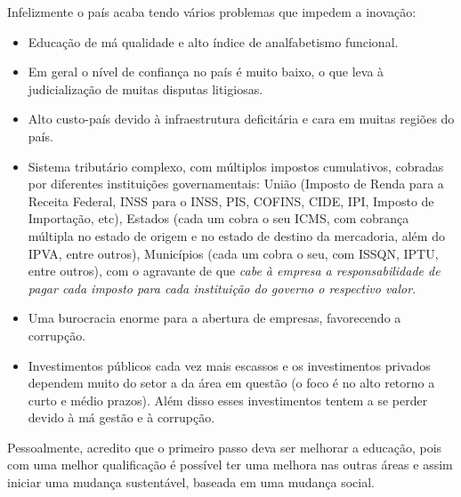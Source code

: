 Infelizmente o país acaba tendo vários problemas que impedem a inovação:
\begin{itemize}
    \item Educação de má qualidade e alto índice de analfabetismo funcional.
    \item Em geral o nível de confiança no país é muito baixo, o que leva à judicialização de muitas disputas litigiosas.
    \item Alto custo-país devido à infraestrutura deficitária e cara em muitas regiões do país.
    \item Sistema tributário complexo, com múltiplos impostos cumulativos, cobradas por diferentes instituições governamentais: União (Imposto de Renda para a Receita Federal, INSS para o INSS, PIS, COFINS, CIDE, IPI, Imposto de Importação, etc), Estados (cada um cobra o seu ICMS, com cobrança múltipla no estado de origem e no estado de destino da mercadoria, além do IPVA, entre outros), Municípios (cada um cobra o seu, com ISSQN, IPTU, entre outros), com o agravante de que \textit{cabe à empresa a responsabilidade de pagar cada imposto para cada instituição do governo o respectivo valor}.
    \item Uma burocracia enorme para a abertura de empresas, favorecendo a corrupção.
    \item Investimentos públicos cada vez mais escassos e os investimentos privados dependem muito do setor a da área em questão (o foco é no alto retorno a curto e médio prazos). Além disso esses investimentos tentem a se perder devido à má gestão e à corrupção.
\end{itemize}

Pessoalmente, acredito que o primeiro passo deva ser melhorar a educação, pois com uma melhor qualificação é possível ter uma melhora nas outras áreas e assim iniciar uma mudança sustentável, baseada em uma mudança social.


